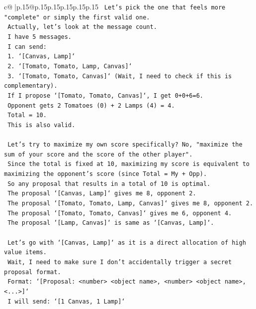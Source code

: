 \documentclass{article}
\begin{document}
{\begin{supertabular}{c@{$\;$}|p{.15\linewidth}@{}p{.15\linewidth}p{.15\linewidth}p{.15\linewidth}p{.15\linewidth}p{.15\linewidth}}
{{{\texttt{    Let's pick the one that feels more "complete" or simply the first valid one.} \\
\texttt{    Actually, let's look at the message count.} \\
\texttt{    I have 5 messages.} \\
\texttt{    I can send:} \\
\texttt{    1. `{[}Canvas, Lamp{]}`} \\
\texttt{    2. `{[}Tomato, Tomato, Lamp, Canvas{]}`} \\
\texttt{    3. `{[}Tomato, Tomato, Canvas{]}` (Wait, I need to check if this is complementary).} \\
\texttt{       If I propose `{[}Tomato, Tomato, Canvas{]}`, I get 0+0+6=6.} \\
\texttt{       Opponent gets 2 Tomatoes (0) + 2 Lamps (4) = 4.} \\
\texttt{       Total = 10.} \\
\texttt{       This is also valid.} \\
\\ 
\texttt{    Let's try to maximize my own score specifically? No, "maximize the sum of your score and the score of the other player".} \\
\texttt{    Since the total is fixed at 10, maximizing my score is equivalent to maximizing the opponent's score (since Total = My + Opp).} \\
\texttt{    So any proposal that results in a total of 10 is optimal.} \\
\texttt{    The proposal `{[}Canvas, Lamp{]}` gives me 8, opponent 2.} \\
\texttt{    The proposal `{[}Tomato, Tomato, Lamp, Canvas{]}` gives me 8, opponent 2.} \\
\texttt{    The proposal `{[}Tomato, Tomato, Canvas{]}` gives me 6, opponent 4.} \\
\texttt{    The proposal `{[}Lamp, Canvas{]}` is same as `{[}Canvas, Lamp{]}`.} \\
\\ 
\texttt{    Let's go with `{[}Canvas, Lamp{]}` as it is a direct allocation of high value items.} \\
\texttt{    Wait, I need to make sure I don't accidentally trigger a secret proposal format.} \\
\texttt{    Format: `{[}Proposal: <number> <object name>, <number> <object name>, <...>{]}`} \\
\texttt{    I will send: `{[}1 Canvas, 1 Lamp{]}`} \\
}}}
\end{supertabular}}
\end{document}
